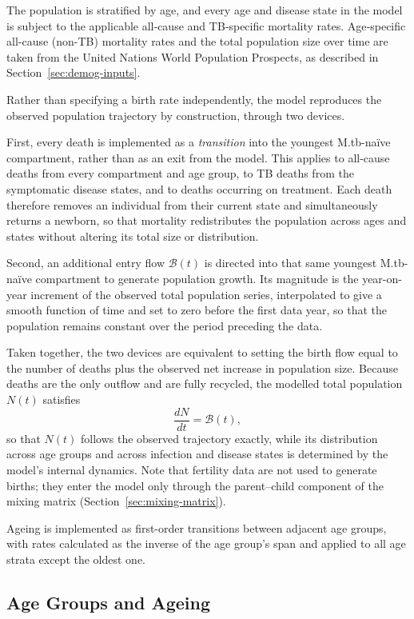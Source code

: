 \documentclass[11pt]{article}
\begin{document}
The population is stratified by age, and every age and disease state in the model is subject to the applicable all‑cause and TB‑specific mortality rates. Age‑specific all-cause (non-TB) mortality rates and the total population size over time are taken from the United Nations World Population Prospects, as described in Section~\ref{sec:demog-inputs}.

Rather than specifying a birth rate independently, the model reproduces the observed population trajectory by construction, through two devices.

First, every death is implemented as a \emph{transition} into the youngest M.tb-na\"ive compartment, rather than as an exit from the model. This applies to all-cause deaths from every compartment and age group, to TB deaths from the symptomatic disease states, and to deaths occurring on treatment. Each death therefore removes an individual from their current state and simultaneously returns a newborn, so that mortality redistributes the population across ages and states without altering its total size or distribution.

Second, an additional entry flow \(\mathcal{B}(t)\) is directed into that same youngest M.tb-na\"ive compartment to generate population growth. Its magnitude is the year-on-year increment of the observed total population series, interpolated to give a smooth function of time and set to zero before the first data year, so that the population remains constant over the period preceding the data.

Taken together, the two devices are equivalent to setting the birth flow equal to the number of deaths plus the observed net increase in population size. Because deaths are the only outflow and are fully recycled, the modelled total population \(N(t)\) satisfies
\[
\frac{dN}{dt} = \mathcal{B}(t),
\]
so that \(N(t)\) follows the observed trajectory exactly, while its distribution across age groups and across infection and disease states is determined by the model's internal dynamics. Note that fertility data are not used to generate births; they enter the model only through the parent--child component of the mixing matrix (Section~\ref{sec:mixing-matrix}).

Ageing is implemented as first-order transitions between adjacent age groups, with rates calculated as the inverse of the age group's span and applied to all age strata except the oldest one.
\subsection{Age Groups and Ageing}
\end{document}
